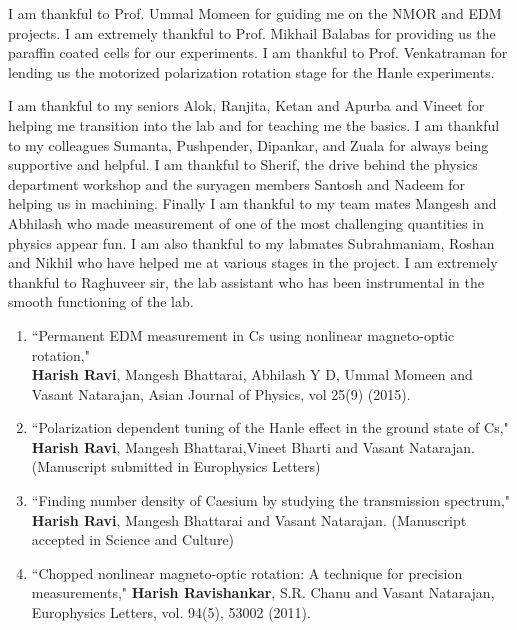 \begin{frontmatter}
I am thankful to Prof. Ummal Momeen for guiding me on the NMOR and EDM projects. I am extremely thankful to Prof. Mikhail Balabas for providing us the paraffin coated cells for our experiments. I am thankful to Prof. Venkatraman for lending us the motorized polarization rotation stage for the Hanle experiments.

I am thankful to my seniors Alok, Ranjita, Ketan and Apurba and Vineet for helping me transition into the lab and for teaching me the basics. I am thankful to my colleagues Sumanta, Pushpender, Dipankar, and Zuala for always being supportive and helpful. I am thankful to Sherif, the drive behind the physics department workshop and the suryagen members Santosh and Nadeem for helping us in machining. Finally I am thankful to my team mates Mangesh and Abhilash who made measurement of one of the most challenging quantities in physics appear fun. I am also thankful to my labmates Subrahmaniam, Roshan and Nikhil who have helped me at various stages in the project. I am extremely thankful to Raghuveer sir, the lab assistant who has been instrumental in the smooth functioning of the lab.

\publications

\begin{enumerate}
\item ``Permanent EDM measurement in Cs using nonlinear magneto-optic rotation," \\
\textbf{Harish Ravi}, Mangesh Bhattarai, Abhilash Y D, Ummal Momeen and Vasant Natarajan, Asian Journal of Physics, vol 25(9) (2015).


	\item ``Polarization dependent tuning of the Hanle effect in the ground state of Cs," 
	\textbf{Harish Ravi}, Mangesh Bhattarai,Vineet Bharti and Vasant Natarajan.(Manuscript submitted in Europhysics Letters)
	\item ``Finding number density of Caesium by studying the transmission spectrum,"\\
	\textbf{Harish Ravi}, Mangesh Bhattarai and Vasant Natarajan. (Manuscript accepted in Science and Culture)

\item ``Chopped nonlinear magneto-optic rotation: A technique for precision measurements," 
\textbf{Harish Ravishankar}, S.R. Chanu and Vasant Natarajan, Europhysics Letters, vol. 94(5), 53002 (2011).


\end{enumerate}
\end{frontmatter}
